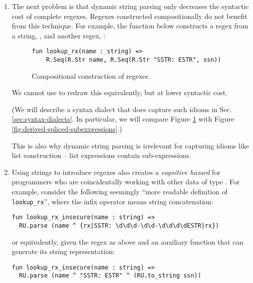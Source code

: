 \begin{enumerate}
\item The next problem is that dynamic string parsing only decreases the syntactic cost of complete regexes. Regexes constructed compositionally do not benefit from this technique. For example, the function below constructs a regex from a string, , and another regex, :
\begin{figure}[h]
\begin{lstlisting}[numbers=none]
  fun lookup_rx(name : string) => 
    R.Seq(R.Str name, R.Seq(R.Str "SSTR: ESTR", ssn))
\end{lstlisting}
\caption{Compositional construction of regexes.}
\label{fig:lookup_rx}
\end{figure}

We cannot use  to redraw this equivalently, but at lower syntactic cost. 

(We will describe a syntax dialect that does capture such idioms in Sec. \ref{sec:syntax-dialects}. In particular, we will compare Figure \ref{fig:lookup_rx} with Figure \ref{fig:derived-spliced-subexpressions}.)

This is also why dynamic string parsing is irrelevant for capturing idioms like list construction -- list expressions contain sub-expressions.


\item Using strings to introduce regexes also creates a \emph{cognitive hazard} for programmers who are coincidentally working with other data of type . For example, consider the following seemingly ``more readable definition of \lstinline{lookup_rx}'', where the infix operator \li{^} means string concatenation:
\begin{lstlisting}[numbers=none,escapechar=~]
fun lookup_rx_insecure(name : string) => 
  RU.parse (name ^ {rx|SSTR: \d\d\d-\d\d-\d\d\d\dESTR|rx})
\end{lstlisting}

or equivalently, given the regex  as above and an auxiliary function  that can generate its string representation:
\begin{lstlisting}[numbers=none,escapechar=~]
fun lookup_rx_insecure(name : string) => 
  RU.parse (name ^ "SSTR: ESTR" ^ (RU.to_string ssn))
\end{lstlisting}


\end{enumerate}
